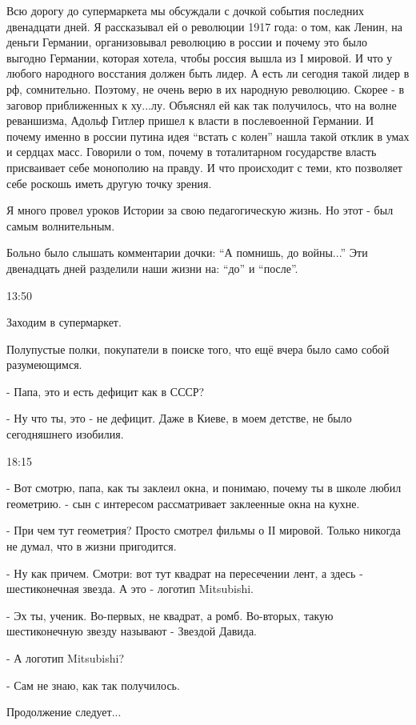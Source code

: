 Всю дорогу до супермаркета мы обсуждали с дочкой события последних двенадцати
дней. Я рассказывал ей о революции 1917 года: о том, как Ленин, на деньги
Германии, организовывал революцию в россии и почему это было выгодно Германии,
которая хотела, чтобы россия вышла из І мировой. И что у любого народного
восстания должен быть лидер. А есть ли сегодня такой лидер в рф, сомнительно.
Поэтому, не очень верю в их народную революцию. Скорее - в заговор приближенных
к ху...лу. Объяснял ей как так получилось, что на волне реваншизма, Адольф
Гитлер пришел к власти в послевоенной Германии. И почему именно в россии путина
идея \enquote{встать с колен} нашла такой отклик в умах и сердцах масс. Говорили о том,
почему в тоталитарном государстве власть присваивает себе монополию на правду.
И что происходит с теми, кто позволяет себе роскошь иметь другую точку зрения.

Я много провел уроков Истории за свою педагогическую жизнь. Но этот - был самым
волнительным. 

Больно было слышать комментарии дочки: \enquote{А помнишь, до войны...} Эти двенадцать
дней разделили наши жизни на: \enquote{до} и \enquote{после}.

13:50

Заходим в супермаркет. 

Полупустые полки, покупатели в поиске того, что ещё вчера было само собой
разумеющимся.

- Папа, это и есть дефицит как в СССР?

- Ну что ты, это - не дефицит. Даже в Киеве, в моем детстве, не было
сегодняшнего изобилия. 

18:15

- Вот смотрю, папа, как ты заклеил окна, и понимаю, почему ты в школе любил
геометрию. - сын с интересом рассматривает заклеенные окна на кухне.

- При чем тут геометрия? Просто смотрел фильмы о ІІ мировой. Только никогда не
думал, что в жизни пригодится.

- Ну как причем. Смотри: вот тут квадрат на пересечении лент, а здесь -
шестиконечная звезда. А это - логотип Mitsubishi.

- Эх ты, ученик. Во-первых, не квадрат, а ромб. Во-вторых, такую шестиконечную
звезду называют - Звездой Давида. 

- А логотип Mitsubishi?

- Сам не знаю, как так получилось.

Продолжение следует...
